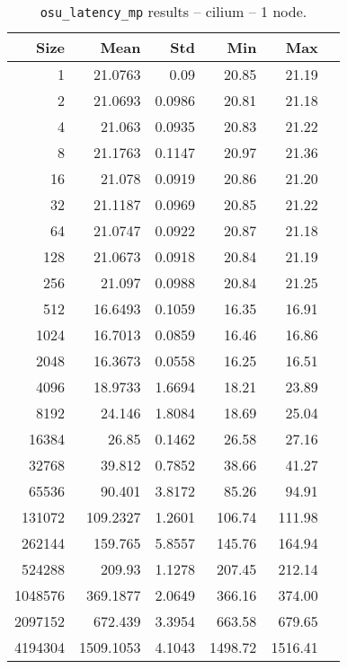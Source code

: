 
\begin{table}[htbp]
  \centering
  \begin{minipage}{.48\textwidth}
    \centering
    \footnotesize
  \begin{tabular}{rrrrrr}
	\toprule
	\textbf{Size} & \textbf{Mean} & \textbf{Std} & \textbf{Min} & \textbf{Max}	\\
	\midrule
	1	&	21.0763   	&	0.09	&	20.85	&	21.19	\\
	2	&	21.0693   	&	0.0986	&	20.81	&	21.18	\\
	4	&	21.063   	&	0.0935	&	20.83	&	21.22	\\
	8	&	21.1763   	&	0.1147	&	20.97	&	21.36	\\
	16	&	21.078   	&	0.0919	&	20.86	&	21.20	\\
	32	&	21.1187   	&	0.0969	&	20.85	&	21.22	\\
	64	&	21.0747   	&	0.0922	&	20.87	&	21.18	\\
	128	&	21.0673   	&	0.0918	&	20.84	&	21.19	\\
	256	&	21.097   	&	0.0988	&	20.84	&	21.25	\\
	512	&	16.6493   	&	0.1059	&	16.35	&	16.91	\\
	1024	&	16.7013   	&	0.0859	&	16.46	&	16.86	\\
	2048	&	16.3673   	&	0.0558	&	16.25	&	16.51	\\
	4096	&	18.9733   	&	1.6694	&	18.21	&	23.89	\\
	8192	&	24.146   	&	1.8084	&	18.69	&	25.04	\\
	16384	&	26.85   	&	0.1462	&	26.58	&	27.16	\\
	32768	&	39.812   	&	0.7852	&	38.66	&	41.27	\\
	65536	&	90.401   	&	3.8172	&	85.26	&	94.91	\\
	131072	&	109.2327   	&	1.2601	&	106.74	&	111.98	\\
	262144	&	159.765   	&	5.8557	&	145.76	&	164.94	\\
	524288	&	209.93   	&	1.1278	&	207.45	&	212.14	\\
	1048576	&	369.1877   	&	2.0649	&	366.16	&	374.00	\\
	2097152	&	672.439   	&	3.3954	&	663.58	&	679.65	\\
	4194304	&	1509.1053   	&	4.1043	&	1498.72	&	1516.41	\\
	\bottomrule
	\end{tabular}
  \caption{\texttt{osu\_latency\_mp} results -- cilium -- 1 node.}

\end{minipage}
\end{table}

